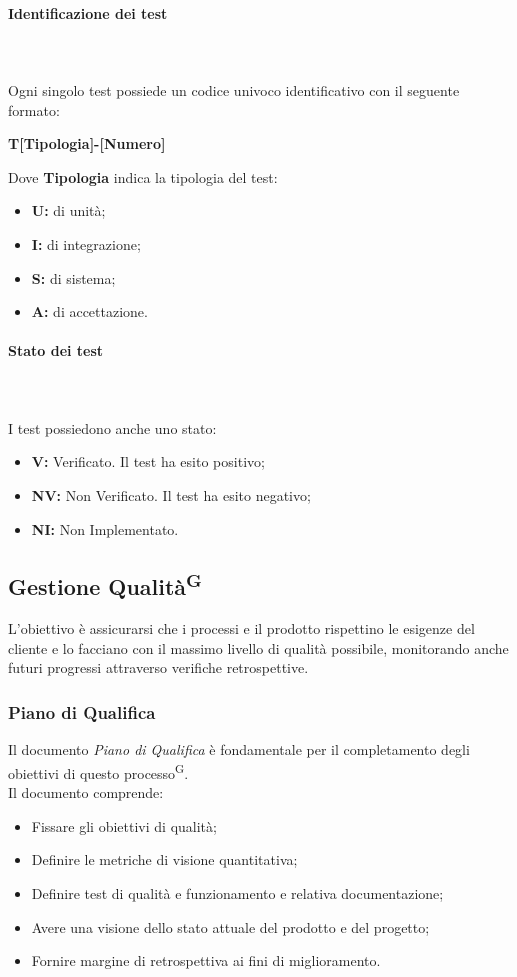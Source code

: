 \documentclass[8pt]{article}
\newcommand{\glossterm}[1]{#1\textsuperscript{G}} %
\newcommand{\subsubsubsection}[1]{\paragraph{#1}\mbox{}\\}
\begin{document}
\subsubsubsection{Identificazione dei test} \\
Ogni singolo test possiede un codice univoco identificativo con il seguente formato:
\begin{center}
	\textbf{T[Tipologia]-[Numero]}
\end{center}
Dove \textbf{Tipologia} indica la tipologia del test: 
\begin{itemize}
    \item \textbf{U:} di unità;
	\item \textbf{I:} di integrazione;
	\item \textbf{S:} di sistema;
	\item \textbf{A:} di accettazione.
\end{itemize}

\subsubsubsection{Stato dei test} \\
I test possiedono anche uno stato:
\begin{itemize}
	\item \textbf{V:} Verificato. Il test ha esito positivo;
	\item \textbf{NV:} Non Verificato. Il test ha esito negativo; 
	\item \textbf{NI:} Non Implementato.
\end{itemize}

\subsection{Gestione \glossterm{Qualità}}
L'obiettivo è assicurarsi che i processi e il prodotto rispettino le esigenze del cliente e lo facciano con il massimo livello di qualità possibile, monitorando anche futuri progressi attraverso verifiche retrospettive.
\subsubsection{Piano di Qualifica}
Il documento \textit{Piano di Qualifica} è fondamentale per il completamento degli obiettivi di questo \glossterm{processo}. 
\\Il documento comprende:
\begin{itemize}
    \item Fissare gli obiettivi di qualità;
    \item Definire le metriche di visione quantitativa;
    \item Definire test di qualità e funzionamento e relativa documentazione;
    \item Avere una visione dello stato attuale del prodotto e del progetto;
    \item Fornire margine di retrospettiva ai fini di miglioramento.
\end{itemize}
\end{document}
